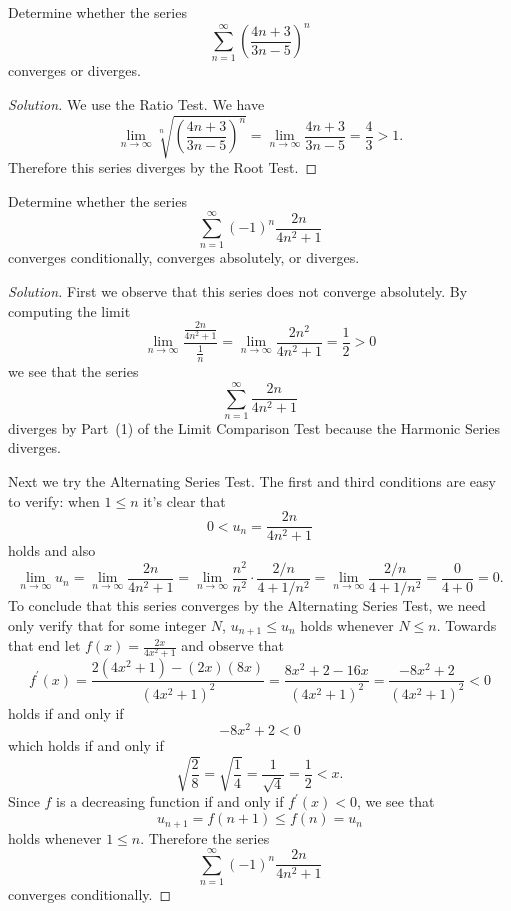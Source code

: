 \documentclass[12pt]{amsart}
\begin{document}
\begin{thm}[15 Points]
  Determine whether the series
  \[\sum_{n = 1}^\infty \left(\frac{4n+3}{3n-5}\right)^n\]
  converges or diverges.
\end{thm}

\begin{proof}[Solution]
  We use the Ratio Test.
  We have
  \[\lim_{n \to \infty} \sqrt[n]{\left(\frac{4n+3}{3n-5}\right)^n} = \lim_{n \to \infty} \frac{4n + 3}{3n - 5} = \frac{4}{3} > 1.\]
  Therefore this series diverges by the Root Test.
\end{proof}

\begin{thm}[15 Points]
  Determine whether the series
  \[\sum_{n = 1}^\infty (-1)^n\frac{2n}{4n^2 + 1}\]
  converges conditionally, converges absolutely, or diverges.
\end{thm}

\begin{proof}[Solution]
  First we observe that this series does not converge absolutely.
  By computing the limit
  \[\lim_{n \to \infty} \frac{\frac{2n}{4n^2 + 1}}{\frac{1}{n}} = \lim_{n \to \infty} \frac{2n^2}{4n^2 + 1} = \frac{1}{2} > 0\]
  we see that the series
  \[\sum_{n = 1}^\infty \frac{2n}{4n^2 + 1}\]
  diverges by Part~(1) of the Limit Comparison Test because the Harmonic Series diverges.

  Next we try the Alternating Series Test.
  The first and third conditions are easy to verify: when \(1 \leq n\) it's clear that
  \[0 < u_n = \frac{2n}{4n^2 + 1}\]
  holds and also
  \[\lim_{n \to \infty} u_n = \lim_{n \to \infty} \frac{2n}{4n^2 + 1} = \lim_{n \to \infty} \frac{n^2}{n^2} \cdot \frac{2/n}{4 + 1/n^2} = \lim_{n \to \infty} \frac{2/n}{4 + 1/n^2} = \frac{0}{4 + 0} = 0.\]
  To conclude that this series converges by the Alternating Series Test, we need only verify that for some integer \(N\), \(u_{n + 1} \leq u_n\) holds whenever \(N \leq n\).
  Towards that end let \(f(x) = \frac{2x}{4x^2 + 1}\) and observe that
  \[f^\prime(x) = \frac{2(4x^2 + 1) - (2x)(8x)}{(4x^2 + 1)^2} = \frac{8x^2 + 2 - 16x}{(4x^2 + 1)^2} = \frac{-8x^2 + 2}{(4x^2 + 1)^2} < 0\]
  holds if and only if
  \[-8x^2 +2 < 0\]
  which holds if and only if
  \[\sqrt{\frac{2}{8}} = \sqrt{\frac{1}{4}} = \frac{1}{\sqrt{4}} = \frac{1}{2} < x.\]
  Since \(f\) is a decreasing function if and only if \(f^\prime(x) < 0\), we see that
  \[u_{n + 1} = f(n + 1) \leq f(n) = u_n\]
  holds whenever \(1 \leq n\).
  Therefore the series
  \[\sum_{n = 1}^\infty (-1)^n\frac{2n}{4n^2 + 1}\]
  converges conditionally.
\end{proof}
\end{document}
